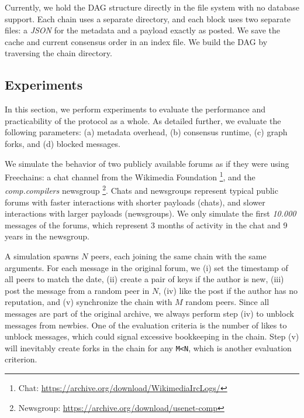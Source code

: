 \documentclass[10pt,journal,compsoc]{IEEEtran}
\newcommand{\FC}       {Freechains\xspace}
\begin{document}
Currently, we hold the DAG structure directly in the file system with no
database support.
Each chain uses a separate directory, and each block uses two separate files:
a \emph{JSON} for the metadata and a payload exactly as posted.
We save the cache and current consensus order in an index file.
We build the DAG by traversing the chain directory.

\subsection{Experiments}
\label{sec.consensus.eval}

In this section, we perform experiments to evaluate the performance and
practicability of the protocol as a whole.
%
As detailed further, we evaluate the following parameters:
    (a) metadata overhead,
    (b) consensus runtime,
    (c) graph forks, and
    (d) blocked messages.

We simulate the behavior of two publicly available forums as if they were using
\FC:
%
    a chat channel from the Wikimedia Foundation%
\footnote{ Chat: \url{https://archive.org/download/WikimediaIrcLogs/} }, and
    the \emph{comp.compilers} newsgroup%
\footnote{ Newsgroup: \url{https://archive.org/download/usenet-comp} }.
%
Chats and newsgroups represent typical public forums with
    faster interactions with shorter payloads (chats), and
    slower interactions with larger payloads (newsgroups).
%
We only simulate the first \emph{10.000} messages of the forums, which
represent 3 months of activity in the chat and 9 years in the newsgroup.

A simulation spawns $N$ peers, each joining the same chain with the same
arguments.
For each message in the original forum, we
    (i)   set the timestamp of all peers to match the date,
    (ii)  create a pair of keys if the author is new,
    (iii) post the message from a random peer in $N$,
    (iv)  like the post if the author has no reputation, and
    (v)   synchronize the chain with $M$ random peers.
%
Since all messages are part of the original archive, we always perform step
(iv) to unblock messages from newbies.
One of the evaluation criteria is the number of likes to unblock messages,
which could signal excessive bookkeeping in the chain.
Step (v) will inevitably create forks in the chain for any \texttt{M<N}, which
is another evaluation criterion.
\end{document}
